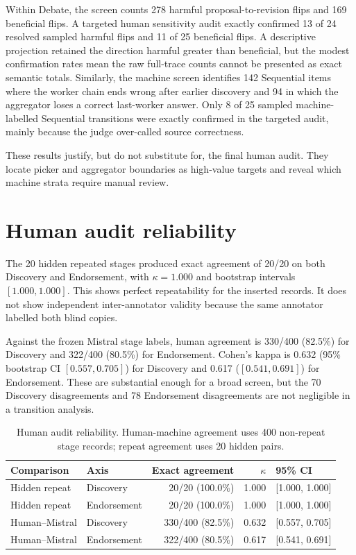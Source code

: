 Within Debate, the screen counts 278 harmful proposal-to-revision flips and 169 beneficial flips. A targeted human sensitivity audit exactly confirmed 13 of 24 resolved sampled harmful flips and 11 of 25 beneficial flips. A descriptive projection retained the direction harmful greater than beneficial, but the modest confirmation rates mean the raw full-trace counts cannot be presented as exact semantic totals. Similarly, the machine screen identifies 142 Sequential items where the worker chain ends wrong after earlier discovery and 94 in which the aggregator loses a correct last-worker answer. Only 8 of 25 sampled machine-labelled Sequential \ctow{} transitions were exactly confirmed in the targeted audit, mainly because the judge over-called source correctness.

These results justify, but do not substitute for, the final human audit. They locate picker and aggregator boundaries as high-value targets and reveal which machine strata require manual review.

\section{Human audit reliability}

The 20 hidden repeated stages produced exact agreement of 20/20 on both Discovery and Endorsement, with $\kappa=1.000$ and bootstrap intervals $[1.000,1.000]$. This shows perfect repeatability for the inserted records. It does not show independent inter-annotator validity because the same annotator labelled both blind copies.

Against the frozen Mistral stage labels, human agreement is 330/400 (82.5\%) for Discovery and 322/400 (80.5\%) for Endorsement. Cohen's kappa is 0.632 (95\% bootstrap CI $[0.557,0.705]$) for Discovery and 0.617 ($[0.541,0.691]$) for Endorsement. These are substantial enough for a broad screen, but the 70 Discovery disagreements and 78 Endorsement disagreements are not negligible in a transition analysis.

\begin{table}[htbp]
  \centering
  \caption[Human audit reliability]{Human audit reliability. Human-machine agreement uses 400 non-repeat stage records; repeat agreement uses 20 hidden pairs.}
  \label{tab:agreement}
  \begin{tabular}{@{}llrrl@{}}
    \toprule
    Comparison & Axis & Exact agreement & $\kappa$ & 95\% CI \\
    \midrule
    Hidden repeat & Discovery & 20/20 (100.0\%) & 1.000 & [1.000, 1.000] \\
    Hidden repeat & Endorsement & 20/20 (100.0\%) & 1.000 & [1.000, 1.000] \\
    Human--Mistral & Discovery & 330/400 (82.5\%) & 0.632 & [0.557, 0.705] \\
    Human--Mistral & Endorsement & 322/400 (80.5\%) & 0.617 & [0.541, 0.691] \\
    \bottomrule
  \end{tabular}
\end{table}

